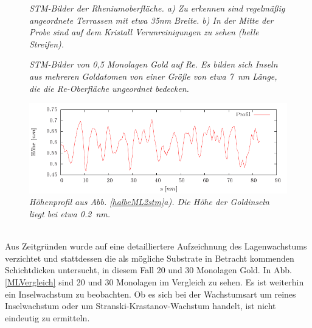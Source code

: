 \begin{figure}[htbp]
	\vspace{-0.5cm}
	\begin{minipage}[b]{0.5\textwidth} 
		\sffamily
		
	\end{minipage}
	\hfill
	\begin{minipage}[b]{0.5\textwidth}
		\sffamily
		
	\end{minipage}
	\caption{\textit{STM-Bilder der Rheniumoberfläche. a) Zu erkennen sind regelmäßig angeordnete
	Terrassen mit etwa 35nm Breite. b) In der Mitte der Probe sind auf dem Kristall Verunreinigungen zu
	sehen (helle Streifen).}}
	\label{rekristallstm} 
	\begin{minipage}[b]{0.5\textwidth} 
		\sffamily
		
	\end{minipage}
	\begin{minipage}[b]{0.5\textwidth}
		\sffamily
		
	\end{minipage}
	\caption{\textit{STM-Bilder von 0,5 Monolagen Gold auf Re. Es bilden sich Inseln aus
	mehreren Goldatomen von einer Größe von etwa \SI{7}{nm} Länge, die die Re-Oberfläche ungeordnet bedecken.}}
	\label{halbeML2stm} 
	\vfill
	\centering
	\includegraphics{pics/profilhalbeML}
	\caption{\textit{Höhenprofil aus Abb. \ref{halbeML2stm}a). Die Höhe der Goldinseln liegt bei etwa
	\SI{0,2}{nm}.}}
	\label{profilhalbeML} 
\end{figure}
\\
Aus Zeitgründen wurde auf eine detailliertere Aufzeichnung des Lagenwachstums
verzichtet und stattdessen die als mögliche Substrate in Betracht kommenden Schichtdicken untersucht, in diesem
Fall 20 und 30 Monolagen Gold.
In Abb. \ref{MLVergleich} sind 20 und 30 Monolagen im Vergleich zu sehen. Es ist weiterhin ein
Inselwachstum zu beobachten. Ob es sich bei der Wachstumsart um reines Inselwachstum oder um
Stranski-Krastanov-Wachstum handelt, ist nicht eindeutig zu ermitteln.


